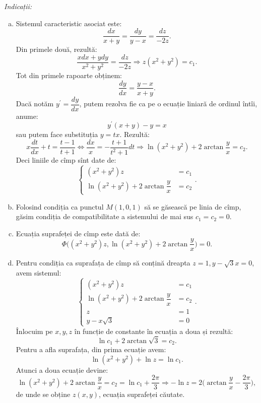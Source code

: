 \emph{Indicații:}
\begin{enumerate}[(a)]
\item Sistemul caracteristic asociat este:
  \[
    \dfrac{dx}{x + y} = \dfrac{dy}{y - x} = \dfrac{dz}{-2z}.
  \]
  Din primele două, rezultă:
  \[
    \dfrac{xdx + ydy}{x^2 + y^2} = \dfrac{dz}{-2z} \Rightarrow %
    z(x^2 + y^2) = c_1.
  \]
  Tot din primele rapoarte obținem:
  \[
    \dfrac{dy}{dx} = \dfrac{y - x}{x + y}.
  \]
  Dacă notăm $ y^\prime = \dfrac{dy}{dx} $, putem rezolva fie ca pe o ecuație liniară
  de ordinul întîi, anume:
  \[
    y^\prime (x + y) - y = x
  \]
  sau putem face substituția $ y = tx $. Rezultă:
  \[
    x \dfrac{dt}{dx} + t = \dfrac{t - 1}{t + 1} \Leftrightarrow %
    \dfrac{dx}{x} = - \dfrac{t + 1}{t^2 + 1} dt \Rightarrow \ln(x^2 + y^2) + 2 \arctan \dfrac{y}{x} = c_2.
  \]
  Deci liniile de cîmp sînt date de:
  \[
    \begin{cases}
      (x^2 + y^2)z &= c_1 \\
      \ln(x^2 + y^2) + 2 \arctan \dfrac{y}{x} &= c_2
    \end{cases}.
  \]
\item Folosind condiția ca punctul $ M(1, 0, 1) $ să se găsească pe linia de cîmp, găsim
  condiția de compatibilitate a sistemului de mai sus $ c_1 = c_2 = 0 $.
\item Ecuația suprafeței de cîmp este dată de:
  \[
    \Phi\Big((x^2 + y^2)z, \ln(x^2 + y^2) + 2 \arctan \dfrac{y}{x}\Big) = 0.
  \]
\item Pentru condiția ca suprafața de cîmp să conțină dreapta $ z = 1, y - \sqrt{3} x = 0 $,
  avem sistemul:
  \[
    \begin{cases}
      (x^2 + y^2)z &= c_1 \\
      \ln(x^2 + y^2) + 2 \arctan \dfrac{y}{x} &= c_2 \\
      z &= 1 \\
      y - x\sqrt{3} &= 0
    \end{cases}.
  \]
  Înlocuim pe $ x , y , z $ în funcție de constante în ecuația a doua și rezultă:
  \[
    \ln c_1 + 2 \arctan \sqrt{3} = c_2.
  \]
  Pentru a afla suprafața, din prima ecuație avem:
  \[
    \ln(x^2 + y^2) + \ln z = \ln c_1.
  \]
  Atunci a doua ecuație devine:
  \[
    \ln(x^2 + y^2) + 2 \arctan \dfrac{y}{x} = c_2 = \ln c_1 + \dfrac{2\pi}{3} \Rightarrow %
    -\ln z = 2 \Big( \arctan \dfrac{y}{x} - \dfrac{2\pi}{3}\Big),
  \]
  de unde se obține $ z(x, y) $, ecuația suprafeței căutate.
\end{enumerate}

